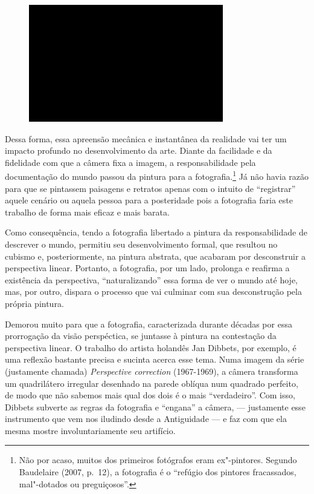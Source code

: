 \begin{figure}[!ht]

\centering
 \includegraphics[width=85mm]{./imgs/im1.jpg}
\caption{\tiny{}}

\end{figure}

Dessa forma, essa apreensão mecânica e instantânea da realidade vai ter
um impacto profundo no desenvolvimento da arte. Diante da facilidade e
da fidelidade com que a câmera fixa a imagem, a responsabilidade pela
documentação do mundo passou da pintura para a fotografia.\footnote{Não
  por acaso, muitos dos primeiros fotógrafos eram ex"-pintores. Segundo
  Baudelaire (2007, p.~12), a fotografia é o ``refúgio dos pintores
  fracassados, mal"-dotados ou preguiçosos''.} Já não havia razão para
que se pintassem paisagens e retratos apenas com o intuito de
``registrar'' aquele cenário ou aquela pessoa para a posteridade pois a
fotografia faria este trabalho de forma mais eficaz e mais barata.

Como consequência, tendo a fotografia libertado a pintura da responsabilidade
de descrever o mundo, permitiu seu desenvolvimento formal, que resultou
no cubismo e, posteriormente, na pintura abstrata, que acabaram por
desconstruir a perspectiva linear. Portanto, a fotografia, por um lado,
prolonga e reafirma a existência da perspectiva, ``naturalizando'' essa
forma de ver o mundo até hoje, mas, por outro, dispara o processo que
vai culminar com sua desconstrução pela própria pintura.

Demorou muito para que a fotografia, caracterizada durante décadas por
essa prorrogação da visão perspéctica, se juntasse à pintura na
contestação da perspectiva linear. O trabalho do artista holandês Jan
Dibbets, por exemplo, é uma reflexão bastante precisa e sucinta acerca
esse tema. Numa imagem da série (justamente chamada) \emph{Perspective
correction} (1967-1969), a câmera transforma um quadrilátero irregular
desenhado na parede oblíqua num quadrado perfeito, de modo que não
sabemos mais qual dos dois é o mais ``verdadeiro''. Com isso, Dibbets
subverte as regras da fotografia e ``engana'' a câmera, --- justamente
esse instrumento que vem nos iludindo desde a Antiguidade --- e faz com
que ela mesma mostre involuntariamente seu artifício.


